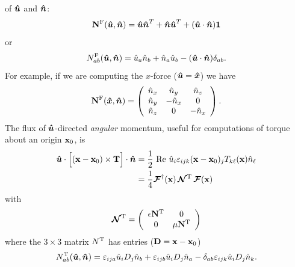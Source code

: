\documentclass[letterpaper]{article}
\begin{document}
of $\boldsymbol{\hat{u}}$ and $\boldsymbol{\hat{n}}$:
$$ \mathbf{N}^{\text{\scriptsize F}}(\boldsymbol{\hat{u}}, \boldsymbol{\hat{n}})
   =  \boldsymbol{\hat{u}} \boldsymbol{\hat{n}}^T
     +\boldsymbol{\hat{n}} \boldsymbol{\hat{u}}^T
     +(\boldsymbol{\hat{u}} \cdot \boldsymbol{\hat{n}})\mathbf{1}
$$
or
$$ N^{\text{\scriptsize F}}_{ab}(\boldsymbol{\hat{u}}, \boldsymbol{\hat{n}}) =
   \hat{u}_{a} \hat{n}_b + \hat{n}_a \hat{u}_b 
  - (\boldsymbol{\hat{u}} \cdot \boldsymbol{\hat{n}})\delta_{ab}.
$$
For example, if we are computing the $x$-force ($\boldsymbol{\hat{u}}=\boldsymbol{\hat{x}}$)
we have 
$$ \mathbf{N}^{\text{\scriptsize F}}(\boldsymbol{\hat{x}}, \boldsymbol{\hat{n}})=
   \left(\begin{array}{ccc}
   \hat{n}_x & \hat n_y   & \hat n_z \\
   \hat{n}_y & -\hat{n}_x & 0 \\
   \hat{n}_z & 0          & -\hat{n}_x
  \end{array}\right).
$$
The flux of $\boldsymbol{\hat{u}}$-directed \textit{angular} momentum, useful
for computations of torque about an origin $\mathbf{x}_0$, is
\begin{align}
 \boldsymbol{\hat{u}} \cdot \Big[ (\mathbf{x}-\mathbf{x}_0) \times \mathbf{T} \Big]
 \cdot \boldsymbol{\hat{n}}
&=\frac{1}{2}
  \text{ Re }
  \hat{u}_i
  \varepsilon_{ijk}(\mathbf{x}-\mathbf{x}_0)_j T_{k\ell}(\mathbf{x}) \hat{n}_\ell
\\
&= \frac{1}{4}\boldsymbol{\mathcal{F}}^\dagger(\mathbf{x}) 
   \, \boldsymbol{\mathcal{N}}^{\text{\scriptsize T}} \, \boldsymbol{\mathcal{F}}(\mathbf{x})
\label{ITVMVP}
\end{align}
with 
$$
   \boldsymbol{\mathcal{N}}^{\text{\scriptsize T}}=
   \left(\begin{array}{cc}
   \epsilon \mathbf{N}^{\text{\scriptsize T}} & 0 \\
            0        & \mu \mathbf{N}^{\text{\scriptsize T}} 
   \end{array}\right)
$$
where the $3\times 3$ matrix $N^{\text{\scriptsize T}}$ has entries ($\mathbf{D}=\mathbf{x}-\mathbf{x}_0$)
$$ N^{\text{\scriptsize T}}_{ab}(\boldsymbol{\hat{u}}, \boldsymbol{\hat{n}})=
   \varepsilon_{ija}\hat{u}_i D_j \hat{n}_b
  +\varepsilon_{ijb}\hat{u}_i D_j \hat{n}_a
  -\delta_{ab} \varepsilon_{ijk} \hat{u}_i D_j \hat{n}_k.
$$

\end{document}
